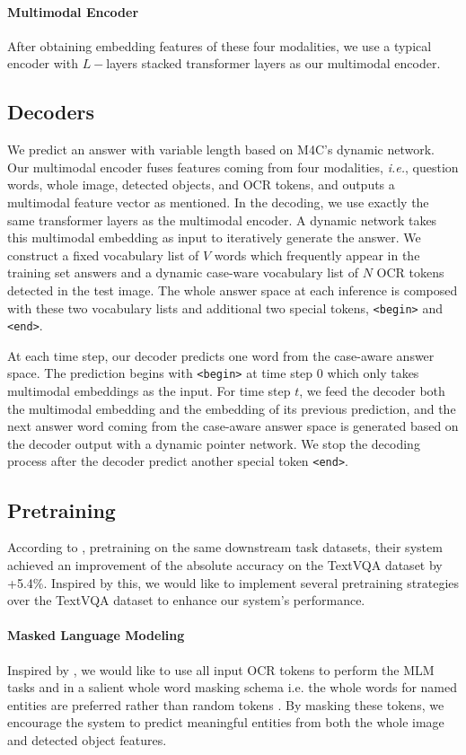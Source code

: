\documentclass[11pt,a4paper]{article}
\begin{document}
\paragraph{Multimodal Encoder} After obtaining embedding features of these four modalities, we use a typical encoder with $L-$layers stacked transformer layers as our multimodal encoder.

\subsection{Decoders}
We predict an answer with variable length based on M4C's dynamic network. Our multimodal encoder fuses features coming from four modalities, \textit{i.e.}, question words, whole image, detected objects, and OCR tokens, and outputs a multimodal feature vector as mentioned. In the decoding, we use exactly the same transformer layers as the multimodal encoder. A dynamic network takes this multimodal embedding as input to iteratively generate the answer. We construct a fixed vocabulary list of $V$ words which frequently appear in the training set answers and a dynamic case-ware vocabulary list of $N$ OCR tokens detected in the test image. The whole answer space at each inference is composed with these two vocabulary lists and additional two special tokens, \texttt{<begin>} and \texttt{<end>}.

At each time step, our decoder predicts one word from the case-aware answer space. The prediction begins with \texttt{<begin>} at time step $0$ which only takes multimodal embeddings as the input. For time step $t$, we feed the decoder both the multimodal embedding and the embedding of its previous prediction, and the next answer word coming from the case-aware answer space is generated based on the decoder output with a dynamic pointer network. We stop the decoding process after the decoder predict another special token \texttt{<end>}.

\subsection{Pretraining}  \label{subsec:pretrain}
According to \citet{yang2021tap}, pretraining on the same downstream task datasets, their system achieved an improvement of the absolute accuracy on the TextVQA dataset by +5.4\%. Inspired by this, we would like to implement several pretraining strategies over the TextVQA dataset to enhance our system's performance.

\paragraph{Masked Language Modeling} Inspired by \citet{kim2021vilt,powalski2021going}, we would like to use all input OCR tokens to perform the MLM tasks and in a salient whole word masking schema i.e. the whole words for named entities are preferred rather than random tokens . By masking these tokens, we encourage the system to predict meaningful entities from both the whole image and detected object features.
\end{document}
